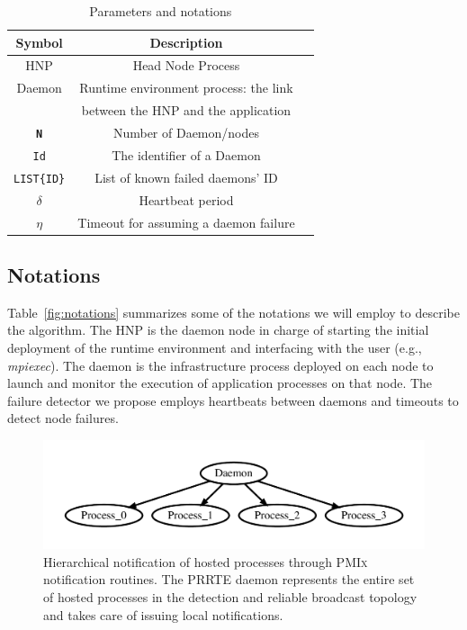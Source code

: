 \documentclass[sigconf]{acmart}
\newcommand{\prrte}[0]{\textsc{PRRTE}\xspace}
\newcommand{\pmix}[0]{\textsc{PMIx}\xspace}
\begin{document}
\begin{table}
  \caption{Parameters and notations}\label{fig:notations}
  \label{tab:parameters}
  \begin{tabular}{ccl}
    \toprule
    Symbol & Description \\
    \midrule
    HNP & Head Node Process \\
    Daemon & Runtime environment process: the link  \\&  between the HNP and the application \\
    \texttt{\bf N} & Number of Daemon/nodes \\
    \texttt{Id} & The identifier of a Daemon \\
    \texttt{LIST\{ID\}} & List of known failed daemons' ID \\
    $\delta$ & Heartbeat period \\
    $\eta$ & Timeout for assuming a daemon failure\\
    \bottomrule
  \end{tabular}
\end{table}

\subsection{Notations}

Table~\ref{fig:notations} summarizes some of the notations we will employ 
to describe the algorithm. The HNP is the daemon node in charge of 
starting the initial deployment of the runtime environment and interfacing 
with the user (e.g., \emph{mpiexec}). The daemon is the infrastructure 
process deployed on each node to launch and monitor the execution of application 
processes on that node. The failure detector we propose employs heartbeats 
between daemons and timeouts to detect node failures.

\begin{figure}[h]
  \centering
  \includegraphics[width=\linewidth]{server_client.pdf}
  \caption{Hierarchical notification of hosted processes through \pmix notification routines. The \prrte daemon represents the entire set of hosted processes in the detection and reliable broadcast topology and takes care of issuing local notifications.}\label{fig:hosted}
\end{figure}
\end{document}
